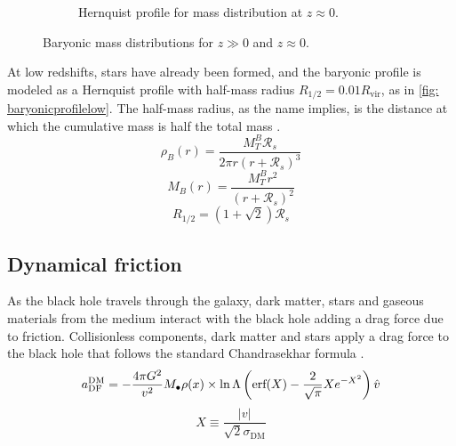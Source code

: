 \begin{figure}[h]
\begin{subfigure}[b]{0.49\textwidth}
					\caption{Hernquist profile for mass distribution at $z \approx 0$.}
						\label{fig: baryonicprofilelow}
				\end{subfigure}
				\caption{Baryonic mass distributions for $z \gg 0$ and $z \approx 0$.}
				\label{fig: baryonicprofile}
			\end{figure}

		At low redshifts, stars have already been formed, and the baryonic profile is modeled as a Hernquist profile with half-mass radius $R_{1/2} = 0.01 R_\text{vir}$, as in \autoref{fig: baryonicprofilelow}. The half-mass radius, as the name implies, is the distance at which the cumulative mass is half the total mass \cite{hernquist1990analytical}.
		\begin{equation}
			\rho_B(r) = \dfrac{M_T^B \mathcal{R}_s}{2\pi r(r + \mathcal{R}_s)^3}
		\end{equation}
		\begin{equation}
			M_B(r) = \dfrac{M_T^B r^2}{(r + \mathcal{R}_s)^2}
		\end{equation}
		\begin{equation}
			R_{1/2} = \left(1 + \sqrt{2}\right)\mathcal{R}_s
		\end{equation}
		
	\subsection{Dynamical friction}
		As the black hole travels through the galaxy, dark matter, stars and gaseous materials from the medium interact with the black hole adding a drag force due to friction. Collisionless components, dark matter and stars apply a drag force to the black hole that follows the standard Chandrasekhar formula \cite{choksi2017recoiling}.
		\begin{equation}
			a_\text{DF}^\text{DM} = - \dfrac{4\pi G^2}{v^2}M_\bullet\rho(x) \times \ln \Lambda\left(\text{erf}(X) - \dfrac{2}{\sqrt{\pi}}Xe^{-X^2}\right)\hat{v}
		\end{equation}
		\begin{equation}
			X \equiv \dfrac{|v|}{\sqrt{2}\sigma_\text{DM}}
		\end{equation}
	
	
